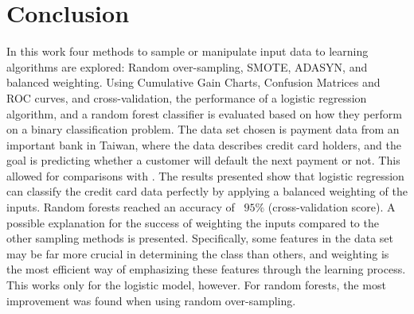 \section{Conclusion}
In this work four methods to sample or manipulate input data to learning
algorithms are explored: Random over-sampling, SMOTE, ADASYN, and balanced
weighting.
Using Cumulative Gain Charts, Confusion Matrices and
ROC curves, and cross-validation, the performance of a logistic regression 
algorithm, and a random forest classifier is evaluated based on how they 
perform on a binary classification problem. 
The data set chosen is payment data from an important bank in Taiwan,
where the data describes credit card holders, and the goal is predicting
whether a customer will default the next payment or not. This allowed for
comparisons with \cite{ComparisonData}. The results presented show that
logistic regression can classify the credit card data perfectly by applying
a balanced weighting of the inputs. Random forests reached an accuracy of
~$95\%$ (cross-validation score). A possible explanation for the success of
weighting the inputs compared to the other sampling methods is presented. 
Specifically, some features in the data set may be far more crucial in
determining the class than others, and weighting is the most efficient way of
emphasizing these features through the learning process.
This works only for the logistic model, however. For random forests, the
most improvement was found when using random over-sampling.


